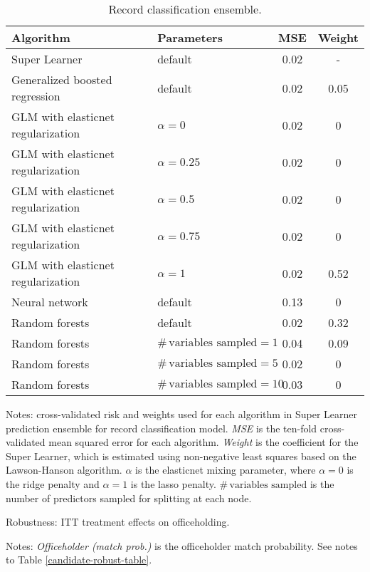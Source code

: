 \begin{table}[htbp]
	\begin{center}
		\caption{Record classification ensemble.\label{ensemble-tab-link}} 
		\begin{tabular}{llcc}
			\hline
			Algorithm & Parameters & MSE & Weight \\ 
			\hline
			\rowcolor{Gray}
			Super Learner & default & 0.02 & - \\
			Generalized boosted regression &  default & 0.02 & 0.05 \\ 
			GLM with elasticnet regularization	 &  $\alpha=0$ & 0.02 & 0 \\  %
			GLM with elasticnet regularization	 &  $\alpha=0.25$ & 0.02& 0 \\ 
			GLM with elasticnet regularization 	&  $\alpha=0.5$ & 0.02 & 0 \\ 
			GLM with elasticnet regularization 	 &  $\alpha=0.75$ & 0.02 & 0 \\ 
			GLM with elasticnet regularization 	 &  $\alpha=1$ & 0.02 & 0.52 \\  %
			Neural network  &  default & 0.13 & 0 \\ 
			Random forests 	& default & 0.02 & 0.32 \\ 
			Random forests 	 & $\# \, \text{variables sampled} =1$ & 0.04 & 0.09 \\ 
			Random forests 	  & $\# \, \text{variables sampled}=5$  & 0.02 & 0 \\ 
			Random forests 	 & $\# \, \text{variables sampled}=10$ & 0.03 & 0 \\ 
			\hline
		\end{tabular} 
	\end{center}
	\footnotesize{Notes: cross-validated risk and weights used for each algorithm in Super Learner prediction ensemble for record classification model. \textit{MSE} is the ten-fold cross-validated mean squared error for each algorithm. \textit{Weight} is the coefficient for the Super Learner, which is estimated using non-negative least squares based on the Lawson-Hanson algorithm. $\alpha$ is the elasticnet mixing parameter, where $\alpha = 0$ is the ridge penalty and $\alpha = 1$ is the lasso penalty. $\# \, \text{variables sampled}$ is the number of predictors sampled for splitting at each node.}
\end{table}

\begin{table}[htbp] 
	\begin{center}
		\caption{Robustness: ITT treatment effects on officeholding.}   \label{officeholding-robust-table}
		\resizebox{0.9\width}{!}{}
	\end{center}
	\footnotesize{Notes: \textit{Officeholder (match prob.)} is the officeholder match probability. See notes to Table \ref{candidate-robust-table}.}  
\end{table} 

